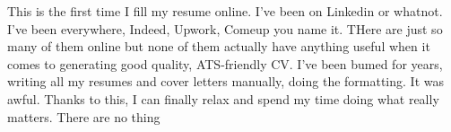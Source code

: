 

This is the first time I fill my resume online. I've been on Linkedin or whatnot. I've been everywhere, Indeed, Upwork, Comeup you name it. THere are just so many of them online but none of them actually have anything useful when it comes to generating good quality, ATS-friendly CV. I've been bumed for years, writing all my resumes and cover letters manually, doing the formatting. It was awful. Thanks to this, I can finally relax and spend my time doing what really matters. There are no thing

    